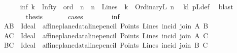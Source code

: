 \begin{isabellebody}
\ \ \ \ \isamarkupfalse%
\ {\isacharparenleft}{\kern0pt}inf{\isacharparenright}{\kern0pt}\ {\isachardoublequoteopen}{\isacharparenleft}{\kern0pt}k\ {\isacharequal}{\kern0pt}\ Infty{\isacharparenright}{\kern0pt}{\isachardoublequoteclose}\ {\isacharbar}{\kern0pt}\ {\isacharparenleft}{\kern0pt}ord{\isacharparenright}{\kern0pt}\ {\isachardoublequoteopen}{\isacharparenleft}{\kern0pt}{\isasymexists}\ n\ {\isachardot}{\kern0pt}\ {\isacharparenleft}{\kern0pt}n\ {\isasymin}\ Lines{\isacharparenright}{\kern0pt}\ {\isasymand}\ {\isacharparenleft}{\kern0pt}k\ {\isacharequal}{\kern0pt}\ OrdinaryL\ n{\isacharparenright}{\kern0pt}{\isacharparenright}{\kern0pt}{\isachardoublequoteclose}\ \isamarkupfalse%
\ kl\ pLdef\ \isamarkupfalse%
\ blast\ \isanewline
\ \ \ \ \isamarkupfalse%
\ \isamarkupfalse%
\ {\isacharquery}{\kern0pt}thesis\ \isanewline
\ \ \ \ \isamarkupfalse%
\ cases\isanewline
\ \ \ \ \ \ \isamarkupfalse%
\ inf\isanewline
\ \ \ \ \ \ \isamarkupfalse%
\ {\isacharquery}{\kern0pt}AB\ {\isacharequal}{\kern0pt}\ {\isachardoublequoteopen}{\isacharparenleft}{\kern0pt}Ideal\ \ {\isacharparenleft}{\kern0pt}affine{\isacharunderscore}{\kern0pt}plane{\isacharunderscore}{\kern0pt}data{\isachardot}{\kern0pt}line{\isacharunderscore}{\kern0pt}pencil\ Points\ Lines\ {\isacharparenleft}{\kern0pt}incid{\isacharparenright}{\kern0pt}\ {\isacharparenleft}{\kern0pt}join\ A\ B{\isacharparenright}{\kern0pt}{\isacharparenright}{\kern0pt}{\isacharparenright}{\kern0pt}{\isachardoublequoteclose}\isanewline
\ \ \ \ \ \ \isamarkupfalse%
\ {\isacharquery}{\kern0pt}AC\ {\isacharequal}{\kern0pt}\ {\isachardoublequoteopen}{\isacharparenleft}{\kern0pt}Ideal\ \ {\isacharparenleft}{\kern0pt}affine{\isacharunderscore}{\kern0pt}plane{\isacharunderscore}{\kern0pt}data{\isachardot}{\kern0pt}line{\isacharunderscore}{\kern0pt}pencil\ Points\ Lines\ {\isacharparenleft}{\kern0pt}incid{\isacharparenright}{\kern0pt}\ {\isacharparenleft}{\kern0pt}join\ A\ C{\isacharparenright}{\kern0pt}{\isacharparenright}{\kern0pt}{\isacharparenright}{\kern0pt}{\isachardoublequoteclose}\isanewline
\ \ \ \ \ \ \isamarkupfalse%
\ {\isacharquery}{\kern0pt}BC\ {\isacharequal}{\kern0pt}\ {\isachardoublequoteopen}{\isacharparenleft}{\kern0pt}Ideal\ \ {\isacharparenleft}{\kern0pt}affine{\isacharunderscore}{\kern0pt}plane{\isacharunderscore}{\kern0pt}data{\isachardot}{\kern0pt}line{\isacharunderscore}{\kern0pt}pencil\ Points\ Lines\ {\isacharparenleft}{\kern0pt}incid{\isacharparenright}{\kern0pt}\ {\isacharparenleft}{\kern0pt}join\ B\ C{\isacharparenright}{\kern0pt}{\isacharparenright}{\kern0pt}{\isacharparenright}{\kern0pt}{\isachardoublequoteclose}\isanewline

\end{isabellebody}

